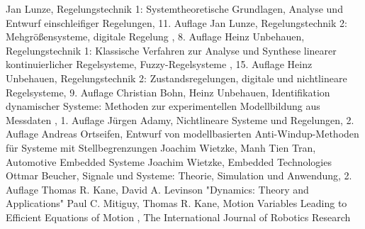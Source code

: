 \begin{thebibliography}{999}%
 Jan Lunze, \glqq Regelungstechnik 1: Systemtheoretische Grundlagen, Analyse und Entwurf einschleifiger Regelungen\grqq , 11. Auflage
 Jan Lunze, \glqq Regelungstechnik 2: Mehgrößensysteme, digitale Regelung \grqq , 8. Auflage
 Heinz Unbehauen, \glqq Regelungstechnik 1: Klassische Verfahren zur Analyse und Synthese linearer kontinuierlicher Regelsysteme, Fuzzy-Regelsysteme \grqq , 15. Auflage
 Heinz Unbehauen, \glqq Regelungstechnik 2: Zustandsregelungen, digitale und nichtlineare Regelsysteme\grqq , 9. Auflage
 Christian Bohn, Heinz Unbehauen, \glqq Identifikation dynamischer Systeme: Methoden zur experimentellen Modellbildung aus Messdaten \grqq , 1. Auflage
 Jürgen Adamy, \glqq Nichtlineare Systeme und Regelungen\grqq , 2. Auflage
 Andreas Ortseifen, \glqq Entwurf von modellbasierten Anti-Windup-Methoden für Systeme mit Stellbegrenzungen\grqq
 Joachim Wietzke, Manh Tien Tran, \glqq Automotive Embedded Systeme\grqq
 Joachim Wietzke, \glqq Embedded Technologies\grqq
 Ottmar Beucher, \glqq Signale und Systeme: Theorie, Simulation und Anwendung\grqq , 2. Auflage
 Thomas R. Kane, David A. Levinson "Dynamics: Theory and Applications"
 Paul C. Mitiguy, Thomas R. Kane, \glqq Motion Variables Leading to Efficient Equations of Motion \grqq , The International Journal of Robotics Research

\end{thebibliography}
